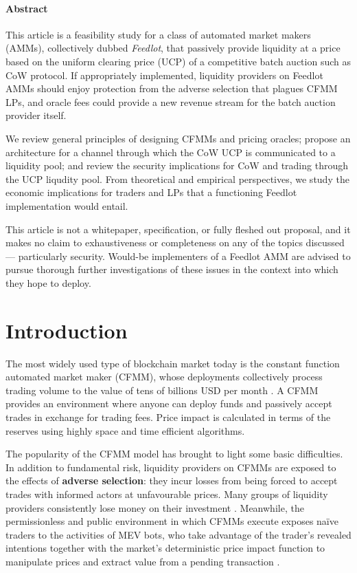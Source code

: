 \documentclass[a4paper,10pt]{article}
\theoremstyle{remark}
\begin{document}
\maketitle
\printsplash

\paragraph{Abstract}

This article is a feasibility study for a class of automated market makers (AMMs), collectively dubbed \emph{Feedlot}, that passively provide liquidity at a price based on the uniform clearing price (UCP) of a competitive batch auction such as CoW protocol.
%
If appropriately implemented, liquidity providers on Feedlot AMMs should enjoy protection from the adverse selection that plagues CFMM LPs, and oracle fees could provide a new revenue stream for the batch auction provider itself.

We review general principles of designing CFMMs and pricing oracles; propose an architecture for a channel through which the CoW UCP is communicated to a liquidity pool; and review the security implications for CoW and trading through the UCP liqudity pool. From theoretical and empirical perspectives, we study the economic implications for traders and LPs that a functioning Feedlot implementation would entail.

This article is not a whitepaper, specification, or fully fleshed out proposal, and it makes no claim to exhaustiveness or completeness on any of the topics discussed --- particularly security. 
%
Would-be implementers of a Feedlot AMM are advised to pursue thorough further investigations of these issues in the context into which they hope to deploy.

\section{Introduction}

The most widely used type of blockchain market today is the constant function automated market maker (CFMM), whose deployments collectively process trading volume to the value of tens of billions USD per month \cite{buterin2016lets, adams2020uniswap, oneill2023can}.
%
A CFMM provides an environment where anyone can deploy funds and passively accept trades in exchange for trading fees.
%
Price impact is calculated in terms of the reserves using highly space and time efficient algorithms.

The popularity of the CFMM model has brought to light some basic difficulties.
%
In addition to fundamental risk, liquidity providers on CFMMs are exposed to the effects of \textbf{adverse selection}: they incur losses from being forced to accept trades with informed actors at unfavourable prices.  
%
Many groups of liquidity providers consistently lose money on their investment \cite{loesch2021impermanent}.
%
Meanwhile, the permissionless and public environment in which CFMMs execute exposes na\"ive traders to the activities of MEV bots, who take advantage of the trader's revealed intentions together with the market's deterministic price impact function to manipulate prices and extract value from a pending transaction \cite{zhou2021high, holloway2023value}.
\end{document}
